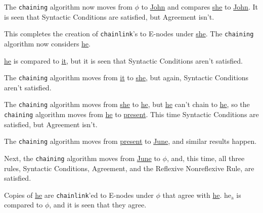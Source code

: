 \documentclass{article}
\begin{document}
The \texttt{chaining} algorithm now moves from \underline{${\phi}$}
to \underline{John} and compares \underline{she} to
\underline{John}. It is seen that Syntactic Conditions are
satisfied, but Agreement isn't.

\bigbreak
\vbox{}
\bigbreak

\noindent This completes the creation of \texttt{chainlink}'s to
E-nodes under \underline{she}. The \texttt{chaining} algorithm
now considers \underline{he}.

\underline{he} is compared to \underline{it}, but it is seen
that Syntactic Conditions aren't satisfied.

\bigbreak
\vbox{}
\bigbreak

The \texttt{chaining} algorithm moves from \underline{it} to
\underline{she}, but again, Syntactic Conditions aren't
satisfied.

\bigbreak
\vbox{}
\bigbreak

The \texttt{chaining} algorithm moves from \underline{she} to
\underline{he}, but \underline{he} can't chain to
\underline{he}, so the \texttt{chaining} algorithm moves from
\underline{he} to \underline{present}. This time Syntactic
Conditions are satisfied, but Agreement isn't.

\bigbreak
\vbox{}
\bigbreak

The \texttt{chaining} algorithm moves from \underline{present}
to \underline{June}, and similar results happen.

\bigbreak
\vbox{}
\bigbreak

Next, the \texttt{chaining} algorithm moves from
\underline{June} to \underline{${\phi}$}, and, this time, all three
rules, Syntactic Conditions, Agreement, and the Reflexive
Nonreflexive Rule, are satisfied.

\bigbreak
\vbox{}
\bigbreak

\noindent Copies of \underline{he} are \texttt{chainlink}'ed to
E-nodes under \underline{${\phi}$} that agree with
\underline{he}. \underline{${\textrm{he}_{\textrm{a}}}$} is compared to \underline{${\phi}$},
and it is seen that they agree.

\bigbreak
\vbox{}
\bigbreak
\end{document}
